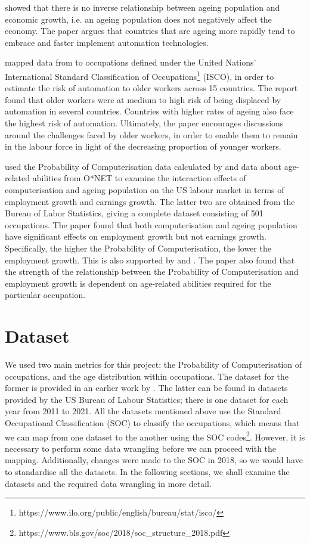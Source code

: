 \documentclass[11pt]{article}
\begin{document}
\cite{10.1257/aer.p20171101} showed that there is no inverse relationship between ageing population and economic growth, i.e. an ageing population does not negatively affect the economy. The paper argues that countries that are ageing more rapidly tend to embrace and faster implement automation technologies.

\cite{twinthreats} mapped data from \cite{osborne2017future} to occupations defined under the United Nations' International Standard Classification of Occupations\footnote{https://www.ilo.org/public/english/bureau/stat/isco/} (ISCO), in order to estimate the risk of automation to older workers across 15 countries. The report found that older workers were at medium to high risk of being displaced by automation in several countries. Countries with higher rates of ageing also face the highest risk of automation. Ultimately, the paper encourages discussions around the challenges faced by older workers, in order to enable them to remain in the labour force in light of the decreasing proportion of younger workers.

\cite{10.1371/journal.pone.0263704} used the Probability of Computerisation data calculated by \cite{osborne2017future} and data about age-related abilities from O*NET to examine the interaction effects of computerisation and ageing population on the US labour market in terms of employment growth and earnings growth. The latter two are obtained from the Bureau of Labor Statistics, giving a complete dataset consisting of 501 occupations. The paper found that both computerisation and ageing population have significant effects on employment growth but not earnings growth. Specifically, the higher the Probability of Computerisation, the lower the employment growth. This is also supported by \cite{graetz2018robots} and \cite{acemoglu2020robots}. The paper also found that the strength of the relationship between the Probability of Computerisation and employment  growth is dependent on age-related abilities required for the particular occupation.

\newpage

\section{Dataset}
\label{sec:Dataset}
We used two main metrics for this project: the Probability of Computerisation of occupations, and the age distribution within occupations. The dataset for the former is provided in an earlier work by \cite{futureofemployment}. The latter can be found in datasets provided by the US Bureau of Labour Statistics; there is one dataset for each year from 2011 to 2021. All the datasets mentioned above use the Standard Occupational Classification (SOC) to classify the occupations, which means that we can map from one dataset to the another using the SOC codes\footnote{https://www.bls.gov/soc/2018/soc\_structure\_2018.pdf}. However, it is necessary to perform some data wrangling before we can proceed with the mapping. Additionally, changes were made to the SOC in 2018, so we would have to standardise all the datasets. In the following sections, we shall examine the datasets and the required data wrangling in more detail.
\end{document}
